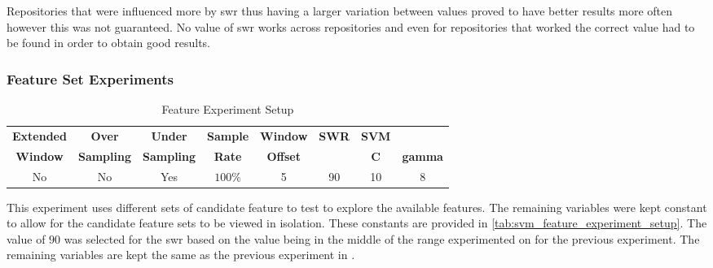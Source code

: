 Repositories that were influenced more by \gls{swr} thus having a larger variation between values proved to have better results more often however this was not guaranteed. No value of \gls{swr} works across repositories and even for repositories that worked the correct value had to be found in order to obtain good results.

    
\subsubsection{Feature Set Experiments}
\label{sec:svm_feature_set_experiments}


\begin{table}[h]
\begin{center}

    \begin{tabular}{|c|c|c|c|c|c|cc|}
        \hline
        \textbf{Extended} & \textbf{Over} & \textbf{Under} & \textbf{Sample} & \textbf{Window} & \textbf{SWR} & \textbf{SVM} & \\
        \textbf{Window} & \textbf{Sampling} & \textbf{Sampling} & \textbf{Rate} & \textbf{Offset} &  & \textbf{C} & \textbf{gamma} \\ \hline
        No & No & Yes & $100\%$ & 5 & 90 & 10 & 8 \\ \hline
    \end{tabular}
    \caption{Feature Experiment Setup}
    \label{tab:svm_feature_experiment_setup}
\end{center}

\end{table}



This experiment uses different sets of candidate feature to test to explore the available features. The remaining variables were kept constant to allow for the candidate feature sets to be viewed in isolation. These constants are provided in \autoref{tab:svm_feature_experiment_setup}. The value of $90$ was selected for the \gls{swr} based on the value being in the middle of the range experimented on for the previous experiment. The remaining variables are kept the same as the previous experiment in . 

